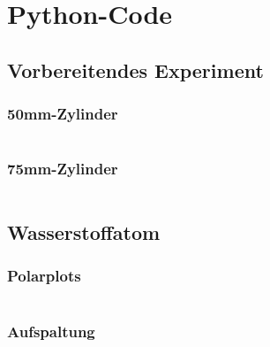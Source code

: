 \section{Python-Code}
\label{sec:Python-Code}

\subsection{Vorbereitendes Experiment}
\subsubsection{50mm-Zylinder}
\inputminted{python3}{vorbereitung_50mm.py}
\subsubsection{75mm-Zylinder}
\inputminted{python3}{vorbereitung_75mm.py}
\subsection{Wasserstoffatom}
\subsubsection{Polarplots}
\inputminted{python3}{spolarplot.py}
\subsubsection{Aufspaltung}
\inputminted{python3}{split.py}
\clearpage
